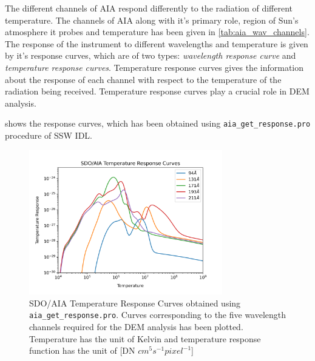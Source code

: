 The different channels of AIA respond differently to the radiation of different temperature. The channels of AIA along with it's primary role, region of Sun's atmosphere it probes and temperature has been given in \cref{tab:aia_wav_channels}. The response of the instrument to different wavelengths and temperature is given by it's response curves, which are of two types: \textit{wavelength response curve} and \textit{temperature response curves}. Temperature response curves gives the information about the response of each channel with respect to the temperature of the radiation being received. Temperature response curves play a crucial role in DEM analysis.

\noindent {} shows the response curves, which has been obtained using \texttt{aia\_get\_response.pro} procedure of SSW IDL.

\begin{figure}[h!]
    \centering
    \includegraphics[width=0.75\textwidth]{images/aia_tresp.png}
    \caption[AIA Temperature Response Curves]{SDO/AIA Temperature Response Curves obtained using \texttt{aia\_get\_response.pro}. Curves corresponding to the five wavelength channels required for the DEM analysis has been plotted. Temperature has the unit of Kelvin and temperature response function has the unit of [DN $cm^5 s^{-1} pixel^{-1}$]}
    \label{fig:aia_tresp}
\end{figure}

